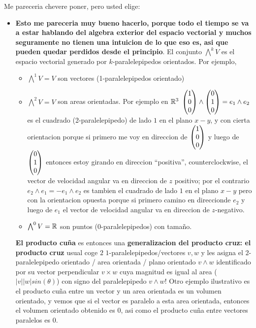 \begin{frame}
    \tiny 
    Me pareceria chevere poner, pero usted elige:
    
        \begin{itemize}
        
        \item \textbf{Esto me pareceria muy bueno hacerlo, porque todo el tiempo se va a estar hablando del algebra exterior del espacio vectorial y muchos seguramente no tienen una intuicion de lo que eso es, asi que pueden quedar perdidos desde el principio}. El conjunto $\bigwedge^k V$ es el espacio vectorial generado por $k$-paralelepipedos orientados. Por ejemplo, 
        
            \begin{itemize}
                
            \item \tiny $\bigwedge^1 V = V$ son vectores (1-paralelepipedos orientado)
            
            \item $\bigwedge^2 V = V$ son areas orientadas. Por ejemplo en $\mathbb R^3$ $ \begin{pmatrix} 1 \\ 0 \\ 0 \end{pmatrix} \wedge \begin{pmatrix} 0 \\ 1 \\ 0 \end{pmatrix} = e_1 \wedge e_2$ es el cuadrado (2-paralelepipedo) de lado $1$ en el plano $x-y$, y con cierta orientacion porque si primero me voy en direccion de $\begin{pmatrix} 1 \\ 0 \\ 0 \end{pmatrix}$ y luego de $\begin{pmatrix} 0 \\ 1 \\ 0 \end{pmatrix}$ entonces estoy girando en direccion ``positiva'', counterclockwise, el vector de velocidad angular va en direccion de $z$ positivo; por el contrario $e_2 \wedge e_1 = -e_1 \wedge e_2$ es tambien el cuadrado de lado $1$ en el plano $x-y$ pero con la orientacion opuesta porque si primero camino en direccionde $e_2$ y luego de $e_1$ el vector de velocidad angular va en direccion de $z$-negativo.
            
            \item $\bigwedge^0 V = \mathbb R$ son puntos (0-paralelepipedos) con tamaño.
        
            \end{itemize}  
        
        \textbf{El producto cuña} es entonces una \textbf{generalizacion del producto cruz: el producto cruz} usual coge $2$ $1$-paralelepipedos/vectores $v, w$ y les asigna el $2$-paralelepipedo orientado / area orientada / plano orientado  $v \wedge w$ identificado por su vector perpendicular $v \times w$ cuya magnitud es igual al area ($|v||w| sin(\theta)$) con signo del paralelepipedo $v \wedge w$! Otro ejemplo ilustrativo es el producto cuña entre un vector y un area orientada es un volumen orientado, y vemos que si el vector es paralelo a esta area orientada, entonces el volumen orientado obtenido es $0$, asi como el producto cuña entre vectores paralelos es $0$.
        

\end{itemize}
\end{frame}
